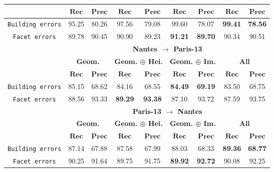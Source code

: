 \begin{table}[htbp]
\begin{tabular}{| c | c c | c c | c c | c c |}
                \cline{2-9}
                & \(\bm{Rec}\) & \(\bm{Prec}\) &  \(\bm{Rec}\) & \(\bm{Prec}\) &  \(\bm{Rec}\) & \(\bm{Prec}\) &  \(\bm{Rec}\) & \(\bm{Prec}\) \\
                \hline
                \texttt{Building errors} & 95.25 & 80.26 & 97.56 & 79.08 & 99.60 & 78.07 & \textbf{99.41} & \textbf{78.56} \\
                \hline
                \texttt{Facet errors} & 89.78 & 90.45 & 90.90 & 89.23 & \textbf{91.21} & \textbf{89.70} & 90.34 & 90.51 \\
                \hline
                \hline
                & \multicolumn{8}{c|}{\textbf{Nantes \(\rightarrow\) Paris-13}} \\
                \hline
                &\multicolumn{2}{c|}{\textbf{Geom.}} & \multicolumn{2}{c|}{\textbf{Geom. \(\oplus\) Hei.}} & \multicolumn{2}{c|}{\textbf{Geom. \(\oplus\) Im.}} & \multicolumn{2}{c|}{\textbf{All}} \\
                \cline{2-9}
                & \(\bm{Rec}\) & \(\bm{Prec}\) &  \(\bm{Rec}\) & \(\bm{Prec}\) &  \(\bm{Rec}\) & \(\bm{Prec}\) &  \(\bm{Rec}\) & \(\bm{Prec}\) \\
                \hline
                \texttt{Building errors} & 85.15 & 68.62 & 84.16 & 68.55 & \textbf{84.49} & \textbf{69.19} & 83.50 & 68.75 \\
                \hline
                \texttt{Facet errors} & 88.56 & 93.33 & \textbf{89.29} & \textbf{93.38} & 87.10 & 93.72 & 87.59 & 93.75 \\
                \hline
                \hline
                & \multicolumn{8}{c|}{\textbf{Paris-13 \(\rightarrow\) Nantes}} \\
                \hline
                &\multicolumn{2}{c|}{\textbf{Geom.}} & \multicolumn{2}{c|}{\textbf{Geom. \(\oplus\) Hei.}} & \multicolumn{2}{c|}{\textbf{Geom. \(\oplus\) Im.}} & \multicolumn{2}{c|}{\textbf{All}} \\
                \cline{2-9}
                & \(\bm{Rec}\) & \(\bm{Prec}\) &  \(\bm{Rec}\) & \(\bm{Prec}\) &  \(\bm{Rec}\) & \(\bm{Prec}\) &  \(\bm{Rec}\) & \(\bm{Prec}\) \\
                \hline
                \texttt{Building errors} & 87.14 & 67.88 & 87.58 & 67.99 & 88.03 & 68.33 & \textbf{89.36} & \textbf{68.77} \\
                \hline
                \texttt{Facet errors} & 90.25 & 91.64 & 89.75 & 91.75 & \textbf{89.92} & \textbf{92.72} & 90.08 & 92.25 \\

\end{tabular}
\end{table}
